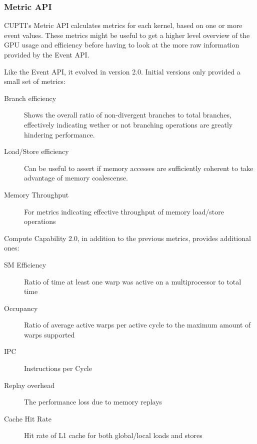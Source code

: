 \subsubsection{Metric API}
\label{sec:cuda:prof:metric}

CUPTI's Metric API calculates metrics for each kernel, based on one or more event values. These metrics might be useful to get a higher level overview of the GPU usage and efficiency before having to look at the more raw information provided by the Event API.

Like the Event API, it evolved in version 2.0. Initial versions only provided a small set of metrics:

\begin{description}
	\item[Branch efficiency] Shows the overall ratio of non-divergent branches to total branches, effectively indicating wether or not branching operations are greatly hindering performance.

	\item[Load/Store efficiency] Can be useful to assert if memory accesses are sufficiently coherent to take advantage of memory coalescense.

	\item[Memory Throughput] For metrics indicating effective throughput of memory load/store operations
\end{description}

Compute Capability 2.0, in addition to the previous metrics, provides additional ones:

\begin{description}
	\item[SM Efficiency] Ratio of time at least one warp was active on a multiprocessor to total time

	\item[Occupancy] Ratio of average active warps per active cycle to the maximum amount of warps supported

	\item[IPC] Instructions per Cycle

	\item[Replay overhead] The performance loss due to memory replays

	\item[Cache Hit Rate] Hit rate of L1 cache for both global/local loads and stores

\end{description}